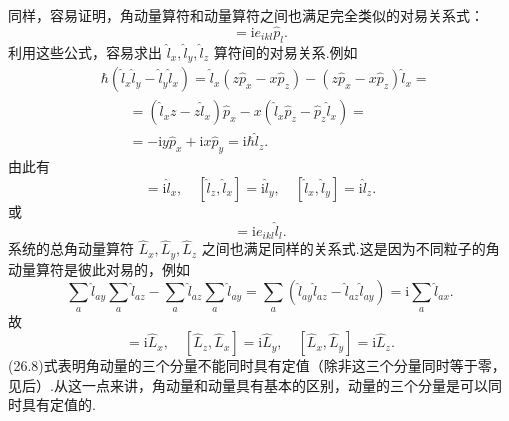 同样，容易证明，角动量算符和动量算符之间也满足完全类似的对易关系式：
\begin{equation}
  [\hat{l}_i,\hat{p}_k]=\mathrm{i}e_{ikl}\hat{p}_l.
\end{equation}
利用这些公式，容易求出 $\hat{l}_x,\hat{l}_y,\hat{l}_z$ 算符间的对易关系.例如
\begin{equation*}
\begin{aligned}
  &\hbar(\hat{l}_x\hat{l}_y-\hat{l}_y\hat{l}_x)
  =\hat{l}_x\left(z\hat{p}_x-x\hat{p}_z\right)
  -\left(z\hat{p}_x-x\hat{p}_z\right)\hat{l}_x=\\
  &\qquad=\left(\hat{l}_xz-z\hat{l}_x\right)\hat{p}_x
  -x\left(\hat{l}_x\hat{p}_z-\hat{p}_z\hat{l}_x\right)=\\
  &\qquad=-\mathrm{i}y\hat{p}_x+\mathrm{i}x\hat{p}_y=\mathrm{i}\hbar\hat{l}_z.
\end{aligned}
\end{equation*}
由此有
\begin{equation}
  [\hat{l}_y,\hat{l}_z]=\mathrm{i}\hat{l}_x,\quad
  [\hat{l}_z,\hat{l}_x]=\mathrm{i}\hat{l}_y,\quad
  [\hat{l}_x,\hat{l}_y]=\mathrm{i}\hat{l}_z.
\end{equation}
或
\begin{equation}
  [\hat{l}_i,\hat{l}_k]=\mathrm{i}e_{ikl}\hat{l}_l.
\end{equation}
系统的总角动量算符 $\hat{L}_x,\hat{L}_y,\hat{L}_z$ 之间也满足同样的关系式.这是因为不同粒子的角动量算符是彼此对易的，例如
\begin{equation*}
  \sum_a\hat{l}_{ay}\sum_a\hat{l}_{az}
  -\sum_a\hat{l}_{az}\sum_a\hat{l}_{ay}
  =\sum_a\left(\hat{l}_{ay}\hat{l}_{az}-\hat{l}_{az}\hat{l}_{ay}\right)
  =\mathrm{i}\sum_a\hat{l}_{ax}.
\end{equation*}
故
\begin{equation}
  [\hat{L}_y,\hat{L}_z]=\mathrm{i}\hat{L}_x,\quad
  [\hat{L}_z,\hat{L}_x]=\mathrm{i}\hat{L}_y,\quad
  [\hat{L}_x,\hat{L}_y]=\mathrm{i}\hat{L}_z.
\end{equation}
(26.8)式表明角动量的三个分量不能同时具有定值（除非这三个分量同时等于零，见后）.从这一点来讲，角动量和动量具有基本的区别，动量的三个分量是可以同时具有定值的.


